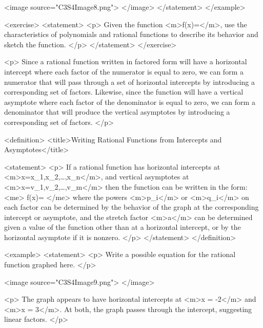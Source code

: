                 <image source="C3S4Image8.png">
                </image>
            </statement>
        </example>

        <exercise>
            <statement>
                <p>
                    Given the function <m>f(x)=</m>, use the characteristics of polynomials and rational functions to describe its behavior and sketch the function.
                </p>
            </statement>
        </exercise>

        <p>
            Since a rational function written in factored form will have a horizontal intercept where each factor of the numerator is equal to zero, we can form a numerator that will pass through a set of horizontal intercepts by introducing a corresponding set of factors.
            Likewise, since the function will have a vertical asymptote where each factor of the denominator is equal to zero, we can form a denominator that will produce the vertical asymptotes by introducing a corresponding set of factors.
        </p>

        <definition>
            <title>Writing Rational Functions from Intercepts and Asymptotes</title>

            <statement>
                <p>
                    If a rational function has horizontal intercepts at <m>x=x_{1},x_{2},\dots,x_{n}</m>, and vertical asymptotes at <m>x=v_{1},v_{2},\dots,v_{m}</m> then the function can be written in the form:
                    <me>
                        f(x)=
                    </me>
                    where the powers <m>p_{i}</m> or <m>q_{i}</m> on each factor can be determined by the behavior of the graph at the corresponding intercept or asymptote, and the stretch factor <m>a</m> can be determined given a value of the function other than at a horizontal intercept, or by the horizontal asymptote if it is nonzero.
                </p>
            </statement>
        </definition>

        <example>
            <statement>
                <p>
                    Write a possible equation for the rational function graphed here.
                </p>

                <image source="C3S4Image9.png">
                </image>

                <p>
                    The graph appears to have horizontal intercepts at <m>x = -2</m> and <m>x = 3</m>.
                    At both, the graph passes through the intercept, suggesting linear factors.
                </p>

